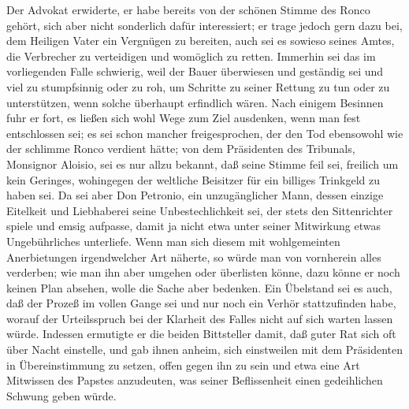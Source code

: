 Der Advokat erwiderte, er habe bereits von der schönen Stimme des
Ronco gehört, sich aber nicht sonderlich dafür interessiert; er
trage jedoch gern dazu bei, dem Heiligen Vater ein Vergnügen zu
bereiten, auch sei es sowieso seines Amtes, die Verbrecher zu
verteidigen und womöglich zu retten. Immerhin sei das im
vorliegenden Falle schwierig, weil der Bauer überwiesen und
geständig sei und viel zu stumpfsinnig oder zu roh, um Schritte zu
seiner Rettung zu tun oder zu unterstützen, wenn solche überhaupt
erfindlich wären. Nach einigem Besinnen fuhr er fort, es ließen
sich wohl Wege zum Ziel ausdenken, wenn man fest entschlossen sei;
es sei schon mancher freigesprochen, der den Tod ebensowohl wie der
schlimme Ronco verdient hätte; von dem Präsidenten des Tribunals,
Monsignor Aloisio, sei es nur allzu bekannt, daß seine Stimme feil
sei, freilich um kein Geringes, wohingegen der weltliche Beisitzer
für ein billiges Trinkgeld zu haben sei. Da sei aber Don
\pagenum{[73]}Petronio, ein unzugänglicher Mann, dessen einzige
Eitelkeit und Liebhaberei seine Unbestechlichkeit sei, der stets
den Sittenrichter spiele und emsig aufpasse, damit ja nicht etwa
unter seiner Mitwirkung etwas Ungebührliches unterliefe. Wenn man
sich diesem mit wohlgemeinten Anerbietungen irgendwelcher Art
näherte, so würde man von vornherein alles verderben; wie man ihn
aber umgehen oder überlisten könne, dazu könne er noch keinen Plan
absehen, wolle die Sache aber bedenken. Ein Übelstand sei es auch,
daß der Prozeß im vollen Gange sei und nur noch ein Verhör
stattzufinden habe, worauf der Urteilsspruch bei der Klarheit des
Falles nicht auf sich warten lassen würde. Indessen ermutigte er
die beiden Bittsteller damit, daß guter Rat sich oft über Nacht
einstelle, und gab ihnen anheim, sich einstweilen mit dem
Präsidenten in Übereinstimmung zu setzen, offen gegen ihn zu sein
und etwa eine Art Mitwissen des Papstes anzudeuten, was seiner
Beflissenheit einen gedeihlichen Schwung geben würde.

